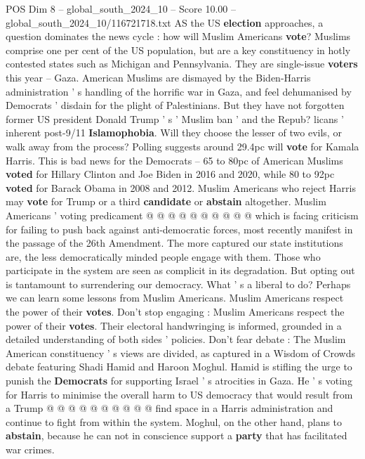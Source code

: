 \begin{textsample}{POS Dim 8 – global\_south\_2024\_10 – Score 10.00 – global\_south\_2024\_10/116721718.txt}  \label{ex:f8_pos_263}
AS the US \textbf{election} approaches, a question dominates the news cycle : how will Muslim Americans \textbf{vote}?
Muslims comprise one per cent of the US population, but are a key constituency in hotly contested states such as Michigan and Pennsylvania.
They are single-issue \textbf{voters} this year -- Gaza.
American Muslims are dismayed by the Biden-Harris administration ' s handling of the horrific war in Gaza, and feel dehumanised by Democrats ' disdain for the plight of Palestinians.
But they have not forgotten former US president Donald Trump ' s ' Muslim ban ' and the Repub? licans ' inherent post-9/11 \textbf{Islamophobia}.
Will they choose the lesser of two evils, or walk away from the process?
Polling suggests around 29.4pc will \textbf{vote} for Kamala Harris.
This is bad news for the Democrats -- 65 to 80pc of American Muslims \textbf{voted} for Hillary Clinton and Joe Biden in 2016 and 2020, while 80 to 92pc \textbf{voted} for Barack Obama in 2008 and 2012.
Muslim Americans who reject Harris may \textbf{vote} for Trump or a third \textbf{candidate} or \textbf{abstain} altogether.
Muslim Americans ' voting predicament @ @ @ @ @ @ @ @ @ @ which is facing criticism for failing to push back against anti-democratic forces, most recently manifest in the passage of the 26th Amendment.
The more captured our state institutions are, the less democratically minded people engage with them.
Those who participate in the system are seen as complicit in its degradation.
But opting out is tantamount to surrendering our democracy.
What ' s a liberal to do?
Perhaps we can learn some lessons from Muslim Americans.
Muslim Americans respect the power of their \textbf{votes}.
Don't stop engaging : Muslim Americans respect the power of their \textbf{votes}.
Their electoral handwringing is informed, grounded in a detailed understanding of both sides ' policies.
Don't fear debate : The Muslim American constituency ' s views are divided, as captured in a Wisdom of Crowds debate featuring Shadi Hamid and Haroon Moghul.
Hamid is stifling the urge to punish the \textbf{Democrats} for supporting Israel ' s atrocities in Gaza.
He ' s voting for Harris to minimise the overall harm to US democracy that would result from a Trump @ @ @ @ @ @ @ @ @ @ find space in a Harris administration and continue to fight from within the system.
Moghul, on the other hand, plans to \textbf{abstain}, because he can not in conscience support a \textbf{party} that has facilitated war crimes.

\end{textsample}
